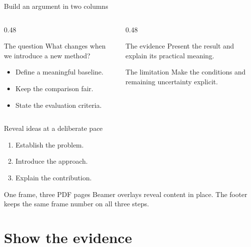 \documentclass[aspectratio=169,11pt,t]{beamer}
\begin{document}
\begin{frame}{Build an argument in two columns}
  \begin{columns}[T,onlytextwidth]
    \begin{column}{0.48\textwidth}
      \begin{block}{The question}
        What changes when we introduce a new method?
      \end{block}
      \begin{itemize}
        \item Define a meaningful baseline.
        \item Keep the comparison fair.
        \item State the evaluation criteria.
      \end{itemize}
    \end{column}
    \begin{column}{0.48\textwidth}
      \begin{exampleblock}{The evidence}
        Present the result and explain its practical meaning.
      \end{exampleblock}
      \begin{alertblock}{The limitation}
        Make the conditions and remaining uncertainty explicit.
      \end{alertblock}
    \end{column}
  \end{columns}
\end{frame}

\begin{frame}{Reveal ideas at a deliberate pace}
  \begin{enumerate}[<+->]
    \item Establish the problem.
    \item Introduce the approach.
    \item Explain the contribution.
  \end{enumerate}
  \bigskip
  \begin{block}{One frame, three PDF pages}
    Beamer overlays reveal content in place. The footer keeps the same
    frame number on all three steps.\cite{beamer-manual}
  \end{block}
\end{frame}

\section{Show the evidence}
\end{document}
